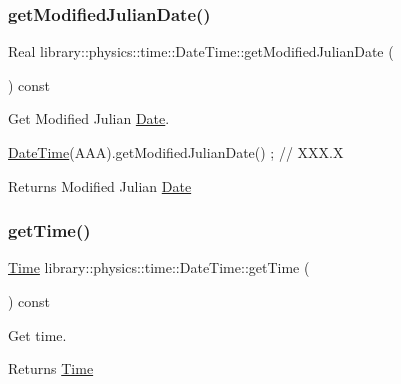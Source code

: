 \subsubsection{\texorpdfstring{get\+Modified\+Julian\+Date()}{getModifiedJulianDate()}}
{\footnotesize\ttfamily Real library\+::physics\+::time\+::\+Date\+Time\+::get\+Modified\+Julian\+Date (\begin{DoxyParamCaption}{ }\end{DoxyParamCaption}) const}



Get Modified Julian \hyperlink{classlibrary_1_1physics_1_1time_1_1_date}{Date}. 


\begin{DoxyCode}
\hyperlink{classlibrary_1_1physics_1_1time_1_1_date_time_a4ea629e533f335c928e037c4ead4646e}{DateTime}(AAA).getModifiedJulianDate() ; \textcolor{comment}{// XXX.X}
\end{DoxyCode}


\begin{DoxyReturn}{Returns}
Modified Julian \hyperlink{classlibrary_1_1physics_1_1time_1_1_date}{Date} 
\end{DoxyReturn}
\mbox{\label{classlibrary_1_1physics_1_1time_1_1_date_time_ab3715b775a96688d1b979c0826c8ae8f}} 
\subsubsection{\texorpdfstring{get\+Time()}{getTime()}}
{\footnotesize\ttfamily \hyperlink{classlibrary_1_1physics_1_1time_1_1_time}{Time} library\+::physics\+::time\+::\+Date\+Time\+::get\+Time (\begin{DoxyParamCaption}{ }\end{DoxyParamCaption}) const}



Get time. 

\begin{DoxyReturn}{Returns}
\hyperlink{classlibrary_1_1physics_1_1time_1_1_time}{Time} 
\end{DoxyReturn}
\mbox{\label{classlibrary_1_1physics_1_1time_1_1_date_time_a24eadd0df51d4426f4be5618db93a8af}} 
